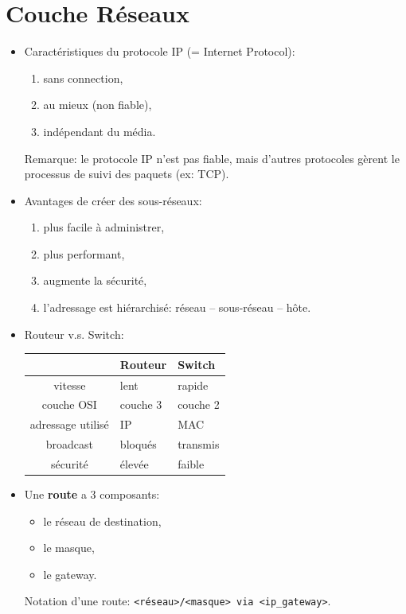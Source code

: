 \documentclass[a4paper]{article}
\begin{document}
\section{Couche Réseaux}





\begin{itemize}





\item Caractéristiques du protocole IP (= Internet Protocol):
\begin{enumerate}
    \item sans connection,
    \item au mieux (non fiable),
    \item indépendant du média.
\end{enumerate}
Remarque: le protocole IP n'est pas fiable, mais d'autres protocoles gèrent le processus de suivi des paquets (ex: TCP).





\item Avantages de créer des sous-réseaux:
\begin{enumerate}
    \item plus facile à administrer,
    \item plus performant,
    \item augmente la sécurité,
    \item l'adressage est hiérarchisé: réseau -- sous-réseau -- hôte.
\end{enumerate}





\item Routeur v.s. Switch:
\begin{center}
\begin{tabular}{|c|C{2cm}|C{2cm}|} \hline
    & Routeur & Switch \\ \hline
    vitesse & lent & rapide \\
    couche OSI & couche 3 & couche 2 \\
    adressage utilisé & IP & MAC \\
    broadcast & bloqués & transmis \\
    sécurité & élevée & faible \\ \hline
\end{tabular}
\end{center}





\item Une \textbf{route} a 3 composants:
\begin{itemize}
    \item le réseau de destination,
    \item le masque,
    \item le gateway.
\end{itemize}
Notation d'une route: \texttt{<réseau>/<masque> via <ip\_gateway>}.





\end{itemize}
\end{document}
